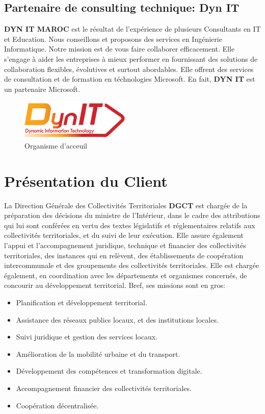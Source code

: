 \documentclass[a4paper]{report}
\begin{document}
\begin{doublespace}
    \subsection{Partenaire de consulting technique: Dyn IT}
    \textbf{DYN IT MAROC} est le résultat de l’expérience de plusieurs Consultants en IT et Education.
    Nous conseillons et proposons des services en Ingénierie Informatique. Notre mission est de
    vous faire collaborer efficacement. Elle s'engage à aider les entreprises à mieux performer
    en fournissant des solutions de collaboration flexibles, évolutives et surtout abordables.
    Elle offrent des services de consultation et de formation en téchnologies Microsoft. En fait,
    \textbf{DYN IT} est un partenaire Microsoft.
    \begin{figure}[H]
        \begin{center}
            \includegraphics[scale=0.6]{images/dynit.png}
            \caption{Organisme d'acceuil}
        \end{center}
    \end{figure}
    \section{Présentation du Client}
    La Direction Générale des Collectivités Territoriales \textbf{DGCT} est chargée de la préparation des décisions du ministre de l’Intérieur,
    dans le cadre des attributions qui lui sont conférées en vertu des textes législatifs et réglementaires relatifs aux collectivités
    territoriales, et du suivi de leur exécution. Elle assure également l’appui et l'accompagnement juridique, technique et financier
    des collectivités territoriales, des instances qui en relèvent, des établissements de coopération intercommunale et des groupements
    des collectivités territoriales. Elle est chargée également, en coordination avec les départements et organismes concernés, de
    concourir au développement territorial. Bref, ses missions sont en gros:
    \begin{itemize}
        \item Planification et développement territorial.
        \item Assistance des réseaux publics locaux, et des institutions locales.
        \item Suivi juridique et gestion des services locaux.
        \item Amélioration de la mobilité urbaine et du transport.
        \item Développement des compétences et transformation digitale.
        \item Accompagnement financier des collectivités territoriales.
        \item Coopération décentralisée.
    \end{itemize}


\end{doublespace}
\end{document}
